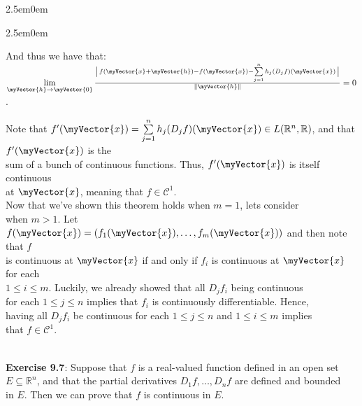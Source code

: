\documentclass{book}
\newcommand{\exOne}{%
   \color{Purple}%
   \fontsize{14}{16}\selectfont%
}
\newenvironment{myIndent}{%
   \begin{adjustwidth}{2.5em}{0em}%
}{%
   \end{adjustwidth}%
}
\newcommand{\mySepTwo}[1][.]{%
   {\noindent\color{#1}{\rule{6.5in}{0.5mm}}}\\%
}
\newcommand{\retTwo}{\hfill\bigbreak}
\newcommand{\myVS}{\vphantom{\ensuremath{\int_a^b}}}
\newcommand{\mVec}[1]{\myVector{#1}}
\begin{document}
{\begin{myIndent}
{\begin{myIndent}
      And thus we have that: $\lim\limits_{\mVec{h} \rightarrow \mVec{0}}\frac{\left|\myVS\right.f(\mVec{x} + \mVec{h}) - f(\mVec{x}) - \sum\limits_{j=1}^nh_j(D_jf)(\mVec{x})\left.\myVS\right|}{\|\mVec{h}\|} = 0$.\retTwo

      Note that $f^\prime(\mVec{x}) = \sum\limits_{j=1}^nh_j(D_jf)(\mVec{x}) \in L(\mathbb{R}^n, \mathbb{R})$, and that $f^\prime(\mVec{x})$ is the\\ [-2pt] sum of a bunch of continuous functions. Thus, $f^\prime(\mVec{x})$ is itself continuous\\ [5pt] at $\mVec{x}$, meaning that $f \in \mathscr{C}^1$.\\ [8pt]

      Now that we've shown this theorem holds when $m = 1$, lets consider\\ when $m > 1$. Let $f(\mVec{x}) = (f_1(\mVec{x}), \ldots, f_m(\mVec{x}))$ and then note that $f$\\ is continuous at $\mVec{x}$ if and only if $f_i$ is continuous at $\mVec{x}$ for each\\ $1 \leq i \leq m$. Luckily, we already showed that all $D_jf_i$ being continuous\\ for each $1 \leq j \leq n$ implies that $f_i$ is continuously differentiable. Hence,\\ having all $D_jf_i$ be continuous for each $1 \leq j \leq n$ and $1 \leq i \leq m$ implies\\ that $f \in \mathscr{C}^{1}$.\retTwo
   \end{myIndent}}
\end{myIndent}}

\exOne
\mySepTwo

\textbf{Exercise 9.7}: Suppose that $f$ is a real-valued function defined in an open set\\ $E \subseteq \mathbb{R}^n$, and that the partial derivatives $D_1f, \ldots, D_nf$ are defined and bounded\\ in $E$. Then we can prove that $f$ is continuous in $E$.\\ [-6pt]
\end{document}

